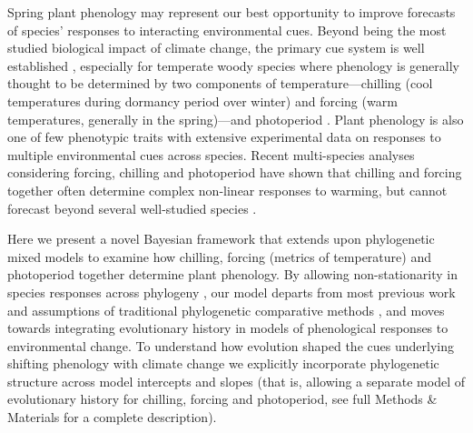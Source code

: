 \documentclass[11pt]{article}
\begin{document}
Spring plant phenology may represent our best opportunity to improve forecasts of species' responses to interacting environmental cues. Beyond being the most studied biological impact of climate change, the primary cue system is well established \citep{chuinearees}, especially for temperate woody species where phenology is generally thought to be determined by two components of temperature---chilling (cool temperatures during dormancy period over winter) and forcing (warm temperatures, generally in the spring)---and photoperiod \citep{ospreephoto}. Plant phenology is also one of few phenotypic traits with extensive experimental data on responses to multiple environmental cues across species. Recent multi-species analyses considering forcing, chilling and photoperiod have shown that chilling and forcing together often determine complex non-linear responses to warming, but cannot forecast beyond several well-studied species \citep{ettinger2020}. %

Here we present a novel Bayesian framework that extends upon phylogenetic mixed models \citep{housworth2004phylogenetic} to examine how chilling, forcing (metrics of temperature) and photoperiod together determine plant phenology. By allowing non-stationarity in species responses across phylogeny \citep{davies2019phylogenetically}, our model departs from most previous work and assumptions of traditional phylogenetic comparative methods \citep[e.g.][]{freckleton2002phylogenetic,ives2011generalized,hadfield2010mcmc}, and moves towards integrating evolutionary history in models of phenological responses to environmental change. To understand how evolution shaped the cues underlying shifting phenology with climate change \citep{uyeda2017evolution} we explicitly incorporate phylogenetic structure across model intercepts and slopes (that is, allowing a separate model of evolutionary history for chilling, forcing and photoperiod, see full Methods \& Materials for a complete description). 
\end{document}
